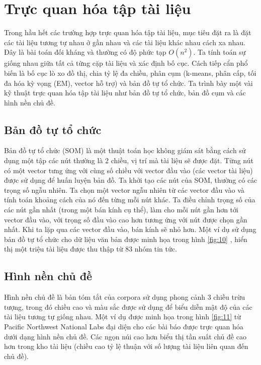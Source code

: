 \documentclass[14pt, a4paper]{article}
\numberwithin{equation}{section}
\numberwithin{figure}{section}
\numberwithin{dl}{section}
\numberwithin{md}{section}
\numberwithin{bd}{section}
\numberwithin{dn}{section}
\numberwithin{hq}{section}
\begin{document}
    \section{Trực quan hóa tập tài liệu}

    Trong hầu hết các trường hợp trực quan hóa tập tài liệu, mục tiêu đặt ra là đặt các tài liệu tương tự nhau ở gần nhau và các tài liệu khác nhau cách xa nhau.
    Đây là bài toán đối kháng và thường có độ phức tạp $O(n^2)$.
    Ta tính toán sự giống nhau giữa tất cả từng cặp tài liệu và xác định bố cục.
    Cách tiếp cẩn phổ biến là bố cục lò xo đồ thị, chia tỷ lệ đa chiều, phân cụm (k-means, phân cấp, tối đa hóa kỳ vọng (EM), vector hỗ trợ) và bản đồ tự tổ chức.
    Ta trình bày một vài kỹ thuật trực quan hóa tập tài liệu như bản đồ tự tổ chức, bản đồ cụm và các hình nền chủ đề.

    \subsection{Bản đồ tự tổ chức}

    Bản đồ tự tổ chức (SOM) \cite{248} là một thuật toán học không giám sát bằng cách sử dụng một tập các nút thường là 2 chiều, vị trí mà tài liệu sẽ được đặt.
    Từng nút có một vector tưng ứng với cùng số chiều với vector đầu vào (các vector tài liệu) được sử dụng để huấn luyện bản đồ.
    Ta khởi tạo các nút của SOM, thường có các trọng số ngẫu nhiên.
    Ta chọn một vector ngẫu nhiên từ các vector đầu vào và tính toán khoảng cách của nó đến từng mỗi nút khác.
    Ta điều chỉnh trọng số của các nút gần nhất (trong một bán kính cụ thể), làm cho mỗi nút gần hơn tới vector đầu vào,
    với trọng số đầu vào cao hơn tương ứng với nút được chọn gần nhất.
    Khi ta lặp qua các vector đầu vào, bán kính sẽ nhỏ hơn.
    Một ví dụ sử dụng bản đồ tự tổ chức cho dữ liệu văn bản được minh họa trong hình \ref{fig:10} \cite{454},
    hiển thị một triệu tài liệu được thu thập từ 83 nhóm tin tức.
    

    \subsection{Hình nền chủ đề}

    Hình nền chủ đề là bản tóm tắt của corpora sử dụng phong cảnh 3 chiều trừu tượng, trong đó chiều cao và màu sắc được sử dụng để biểu diễn mật độ của các tài liệu tương tự giống nhau.
    Một ví dụ được minh họa trong hình \ref{fig:11} từ Pacific Northwest National Labs \cite{407} đại diện cho các bài báo được trực quan hóa dưới dạng hình nền chủ đề.
    Các ngọn núi cao hơn biểu thị tần suất chủ đề cao hơn trong kho tài liệu (chiều cao tỷ lệ thuận với số lượng tài liệu liên quan đến chủ đề).
\end{document}
